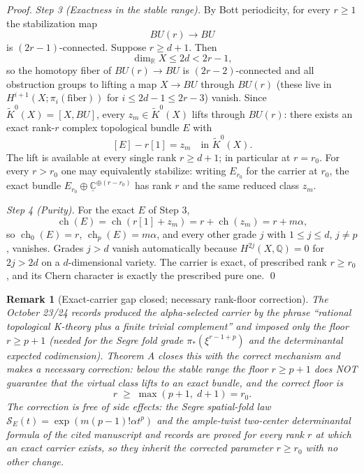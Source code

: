 \documentclass[11pt]{article}
\newtheorem{remark}[theorem]{Remark}
\newcommand{\ch}{\operatorname{ch}}
\begin{document}
\begin{proof}
\smallskip
\emph{Step 3 (Exactness in the stable range).}
By Bott periodicity, for every $r\ge 1$ the stabilization map
\[
  BU(r)\longrightarrow BU
\]
is $(2r-1)$-connected.
Suppose $r\ge d+1$. Then
\[
  \dim_{\mathbb R}X\le 2d<2r-1,
\]
so the homotopy fiber of $BU(r)\to BU$ is $(2r-2)$-connected and all
obstruction groups to lifting a map $X\to BU$ through $BU(r)$
(these live in $H^{i+1}(X;\pi_i(\mathrm{fiber}))$ for
$i\le 2d-1\le 2r-3$) vanish. Since
$\widetilde K^0(X)=[X,BU]$, every $z_m\in\widetilde K^0(X)$ lifts through
$BU(r)$: there exists an exact rank-$r$ complex topological bundle $E$
with
\[
  [E]-r[1]=z_m\quad\text{in }\widetilde K^0(X).
\]
The lift is available at every single rank $r\ge d+1$; in particular
at $r=r_0$. For every $r>r_0$ one may equivalently stabilize: writing
$E_{r_0}$ for the carrier at $r_0$, the exact bundle
$E_{r_0}\oplus \underline{\mathbb C}^{\oplus(r-r_0)}$ has rank $r$ and
the same reduced class $z_m$.

\smallskip
\emph{Step 4 (Purity).}
For the exact $E$ of Step 3,
\[
  \ch(E)=\ch(r[1]+z_m)=r+\ch(z_m)=r+m\alpha ,
\]
so $\ch_0(E)=r$, $\ch_p(E)=m\alpha$, and every other grade $j$ with
$1\le j\le d$, $j\neq p$, vanishes.
Grades $j>d$ vanish automatically because
$H^{2j}(X,\mathbb Q)=0$ for $2j>2d$ on a $d$-dimensional variety.
The carrier is exact, of prescribed rank $r\ge r_0$, and its Chern
character is exactly the prescribed pure one. \qed
\end{proof}

\begin{remark}[Exact-carrier gap closed; necessary rank-floor correction]
\label{rem:rankfloor}
The October 23/24 records produced the alpha-selected carrier by the
phrase ``rational topological K-theory plus a finite trivial
complement'' and imposed only the floor $r\ge p+1$ (needed for the
Segre fold grade $\pi_*(\xi^{r-1+p})$ and the determinantal expected
codimension). Theorem A closes this with the correct mechanism and
makes a necessary correction: below the stable range the floor
$r\ge p+1$ does NOT guarantee that the virtual class lifts to an
exact bundle, and the correct floor is
\[
  r\;\ge\;\max(p+1,\;d+1)=r_0 .
\]
The correction is free of side effects: the Segre spatial-fold law
$\mathcal S_E(t)=\exp(m(p-1)!\alpha t^p)$ and the ample-twist
two-center determinantal formula of the cited manuscript and records
are proved for every rank $r$ at which an exact carrier exists, so
they inherit the corrected parameter $r\ge r_0$ with no other change.
\end{remark}
\end{document}

